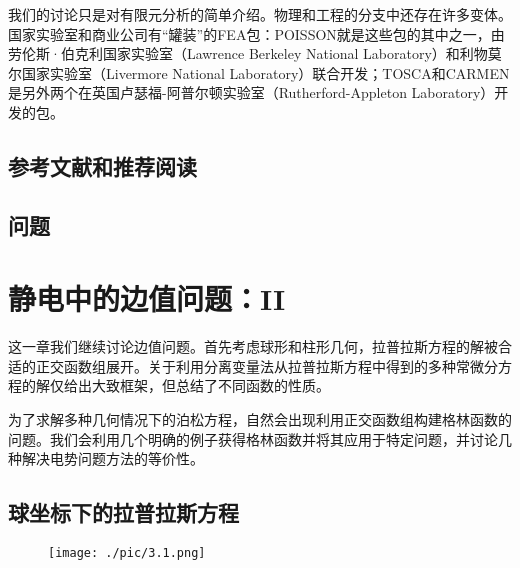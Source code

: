 \documentclass[12pt]{book}
\numberwithin{equation}{chapter}
\numberwithin{figure}{chapter}
\numberwithin{footnote}{page}
\begin{document}
我们的讨论只是对有限元分析的简单介绍。物理和工程的分支中还存在许多变体。国家实验室和商业公司有“罐装”的FEA包：POISSON就是这些包的其中之一，由劳伦斯·伯克利国家实验室（Lawrence Berkeley National Laboratory）和利物莫尔国家实验室（Livermore National Laboratory）联合开发；TOSCA和CARMEN是另外两个在英国卢瑟福-阿普尔顿实验室（Rutherford-Appleton Laboratory）开发的包。

\section*{参考文献和推荐阅读}
\section*{问题}


\chapter{静电中的边值问题：II}\label{cha:3}

这一章我们继续讨论边值问题。首先考虑球形和柱形几何，拉普拉斯方程的解被合适的正交函数组展开。关于利用分离变量法从拉普拉斯方程中得到的多种常微分方程的解仅给出大致框架，但总结了不同函数的性质。

为了求解多种几何情况下的泊松方程，自然会出现利用正交函数组构建格林函数的问题。我们会利用几个明确的例子获得格林函数并将其应用于特定问题，并讨论几种解决电势问题方法的等价性。

\section{球坐标下的拉普拉斯方程}\label{sec:3.1}

\begin{figure}[!ht]
    \centering
    \texttt{[image: ./pic/3.1.png]}
    \captionsetup{justification=raggedright, singlelinecheck=false}
    \caption{}
    \label{fig:3.1}
\end{figure}
\end{document}
